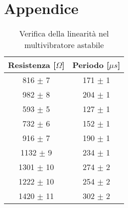 \section{Appendice}
\begin{table}[hb]
	\centering
\begin{tabular}{c c} 
	\toprule
	Resistenza [$\Omega $] & Periodo [$\mu s$]\\
	\midrule
	816 $\pm$ 7 & 171 $\pm$ 1\\
	982 $\pm$ 8 & 204 $\pm$ 1\\
	593 $\pm$ 5 & 127 $\pm$ 1\\
	732 $\pm$ 6 & 152 $\pm$ 1\\
	916 $\pm$ 7 & 190 $\pm$ 1\\
	1132 $\pm$ 9 & 234 $\pm$ 1\\
	1301 $\pm$ 10 & 274 $\pm$ 2\\
	1222 $\pm$ 10 & 254 $\pm$ 2\\
	1420 $\pm$ 11 & 302 $\pm$ 2\\
	\bottomrule
\end{tabular}
\caption{Verifica della linearità nel multivibratore astabile}
	\label{astab_data}
\end{table}